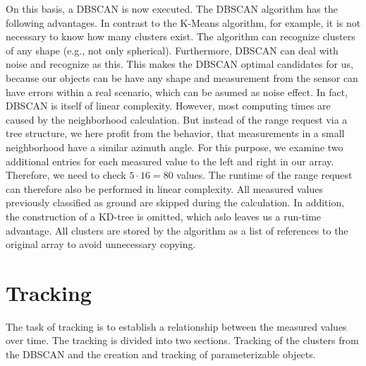 \documentclass[11pt,oneside,openright]{mpreport}
\begin{document}
On this basis, a \ac{DBSCAN} \cite{DBSCAN} is now executed. The \ac{DBSCAN} algorithm has the following advantages. In contrast to the K-Means algorithm,
for example, it is not necessary to know how many clusters exist. The algorithm can recognize clusters of any shape (e.g., not only spherical).
Furthermore, \ac{DBSCAN} can deal with noise and recognize as this. This makes the \ac{DBSCAN} optimal candidates for us, because our objects can be have any shape and 
measurement from the sensor can have errors within a real scenario, which can be asumed as noise effect. 
In fact, \ac{DBSCAN} is itself of linear complexity. However, most computing times are caused by the neighborhood calculation.
But instead of the range request via a tree structure, we here profit from the behavior, that measurements in a small neighborhood have a similar azimuth angle.
For this purpose, we examine two additional entries for each measured value to the left and right in our array. 
Therefore, we need to check $5 \cdot 16 = 80$ values. The runtime of the range request can therefore also be performed in linear complexity.
All measured values previously classified as ground are skipped during the calculation. In addition, the construction of a KD-tree is omitted, which aslo leaves us a run-time advantage.
All clusters are stored by the algorithm as a list of references to the original array to avoid unnecessary copying.


\section{Tracking}
\label{tracking}
The task of tracking is to establish a relationship between the measured values over time. The tracking is divided into two sections.
Tracking of the clusters from the \ac{DBSCAN} and the creation and tracking of parameterizable objects.
\end{document}
